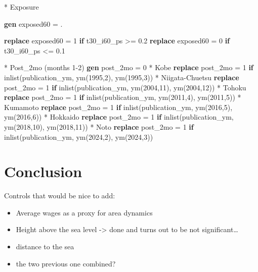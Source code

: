 \documentclass[
  letterpaper,
  DIV=11,
  numbers=noendperiod]{scrartcl}
\newenvironment{Shaded}{\begin{snugshade}}{\end{snugshade}}
\newcommand{\FunctionTok}[1]{\textcolor[rgb]{0.28,0.35,0.67}{#1}}
\newcommand{\KeywordTok}[1]{\textcolor[rgb]{0.00,0.23,0.31}{\textbf{#1}}}
\newcommand{\NormalTok}[1]{\textcolor[rgb]{0.00,0.23,0.31}{#1}}
\providecommand{\tightlist}{%
  \setlength{\itemsep}{0pt}\setlength{\parskip}{0pt}}
\begin{document}
\begin{Shaded}
\begin{Highlighting}[]
\NormalTok{* Exposure}

\KeywordTok{gen}\NormalTok{ exposed60 = .}

\KeywordTok{replace}\NormalTok{ exposed60 = 1 }\KeywordTok{if}\NormalTok{ t30\_i60\_ps \textgreater{}= 0.2}
\KeywordTok{replace}\NormalTok{ exposed60 = 0 }\KeywordTok{if}\NormalTok{ t30\_i60\_ps \textless{}= 0.1}

\NormalTok{* Post\_2mo (months 1{-}2)}
\KeywordTok{gen}\NormalTok{ post\_2mo = 0}
\NormalTok{* Kobe}
\KeywordTok{replace}\NormalTok{ post\_2mo = 1 }\KeywordTok{if} \FunctionTok{inlist}\NormalTok{(publication\_ym, }\FunctionTok{ym}\NormalTok{(1995,2), }\FunctionTok{ym}\NormalTok{(1995,3))}
\NormalTok{* Niigata{-}Chuetsu}
\KeywordTok{replace}\NormalTok{ post\_2mo = 1 }\KeywordTok{if} \FunctionTok{inlist}\NormalTok{(publication\_ym, }\FunctionTok{ym}\NormalTok{(2004,11), }\FunctionTok{ym}\NormalTok{(2004,12))}
\NormalTok{* Tohoku}
\KeywordTok{replace}\NormalTok{ post\_2mo = 1 }\KeywordTok{if} \FunctionTok{inlist}\NormalTok{(publication\_ym, }\FunctionTok{ym}\NormalTok{(2011,4), }\FunctionTok{ym}\NormalTok{(2011,5))}
\NormalTok{* Kumamoto}
\KeywordTok{replace}\NormalTok{ post\_2mo = 1 }\KeywordTok{if} \FunctionTok{inlist}\NormalTok{(publication\_ym, }\FunctionTok{ym}\NormalTok{(2016,5), }\FunctionTok{ym}\NormalTok{(2016,6))}
\NormalTok{* Hokkaido}
\KeywordTok{replace}\NormalTok{ post\_2mo = 1 }\KeywordTok{if} \FunctionTok{inlist}\NormalTok{(publication\_ym, }\FunctionTok{ym}\NormalTok{(2018,10), }\FunctionTok{ym}\NormalTok{(2018,11))}
\NormalTok{* Noto}
\KeywordTok{replace}\NormalTok{ post\_2mo = 1 }\KeywordTok{if} \FunctionTok{inlist}\NormalTok{(publication\_ym, }\FunctionTok{ym}\NormalTok{(2024,2), }\FunctionTok{ym}\NormalTok{(2024,3))}
\end{Highlighting}
\end{Shaded}

\section{Conclusion}

Controls that would be nice to add:

\begin{itemize}
\tightlist
\item
  Average wages as a proxy for area dynamics
\item
  Height above the sea level -\textgreater{} done and turns out to be
  not significant\ldots{}
\item
  distance to the sea
\item
  the two previous one combined?
\end{itemize}
\end{document}
